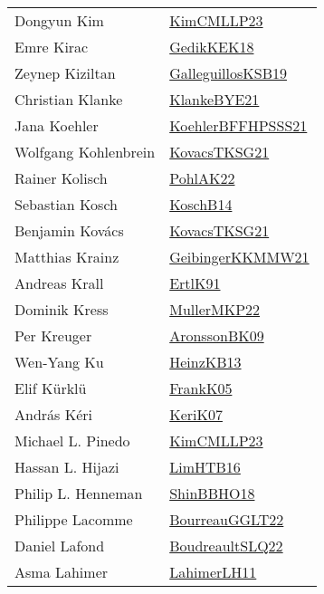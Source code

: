 {\begin{longtable}{p{4cm}p{20cm}}
Dongyun Kim & \href{papers/KimCMLLP23.pdf}{KimCMLLP23}\cite{KimCMLLP23} \\
Emre Kirac & \href{articles/GedikKEK18.pdf}{GedikKEK18}\cite{GedikKEK18} \\
Zeynep Kiziltan & \href{papers/GalleguillosKSB19.pdf}{GalleguillosKSB19}\cite{GalleguillosKSB19} \\
Christian Klanke & \href{papers/KlankeBYE21.pdf}{KlankeBYE21}\cite{KlankeBYE21} \\
Jana Koehler & \href{articles/KoehlerBFFHPSSS21.pdf}{KoehlerBFFHPSSS21}\cite{KoehlerBFFHPSSS21} \\
Wolfgang Kohlenbrein & \href{papers/KovacsTKSG21.pdf}{KovacsTKSG21}\cite{KovacsTKSG21} \\
Rainer Kolisch & \href{articles/PohlAK22.pdf}{PohlAK22}\cite{PohlAK22} \\
Sebastian Kosch & \href{papers/KoschB14.pdf}{KoschB14}\cite{KoschB14} \\
Benjamin Kov{\'{a}}cs & \href{papers/KovacsTKSG21.pdf}{KovacsTKSG21}\cite{KovacsTKSG21} \\
Matthias Krainz & \href{papers/GeibingerKKMMW21.pdf}{GeibingerKKMMW21}\cite{GeibingerKKMMW21} \\
Andreas Krall & \href{papers/ErtlK91.pdf}{ErtlK91}\cite{ErtlK91} \\
Dominik Kress & \href{articles/MullerMKP22.pdf}{MullerMKP22}\cite{MullerMKP22} \\
Per Kreuger & \href{papers/AronssonBK09.pdf}{AronssonBK09}\cite{AronssonBK09} \\
Wen{-}Yang Ku & \href{papers/HeinzKB13.pdf}{HeinzKB13}\cite{HeinzKB13} \\
Elif K{\"{u}}rkl{\"{u}} & \href{papers/FrankK05.pdf}{FrankK05}\cite{FrankK05} \\
Andr{\'{a}}s K{\'{e}}ri & \href{papers/KeriK07.pdf}{KeriK07}\cite{KeriK07} \\
Michael L. Pinedo & \href{papers/KimCMLLP23.pdf}{KimCMLLP23}\cite{KimCMLLP23} \\
Hassan L. Hijazi & \href{papers/LimHTB16.pdf}{LimHTB16}\cite{LimHTB16} \\
Philip L. Henneman & \href{articles/ShinBBHO18.pdf}{ShinBBHO18}\cite{ShinBBHO18} \\
Philippe Lacomme & \href{}{BourreauGGLT22}\cite{BourreauGGLT22} \\
Daniel Lafond & \href{papers/BoudreaultSLQ22.pdf}{BoudreaultSLQ22}\cite{BoudreaultSLQ22} \\
Asma Lahimer & \href{papers/LahimerLH11.pdf}{LahimerLH11}\cite{LahimerLH11} \\

\end{longtable}}
